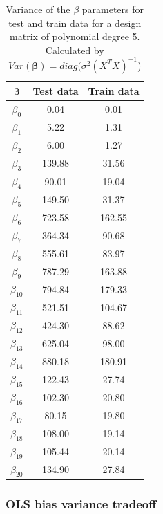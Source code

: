\documentclass[12pt]{article}
\begin{document}
\begin{table}[H]
  \caption{Variance of the $\beta$ parameters for test and train data for a design matrix of polynomial degree 5. Calculated by $Var(\boldsymbol{\beta}) = diag(\sigma^2(X^T X)^{-1}$)}
  \label{tab:beta}
  \centering
  \begin{tabular}{|c|c|c|}
    \hline
    $\boldsymbol{\beta}$ &\textbf{Test data} & \textbf{Train data} \\\hline
    $\beta_{0}$ & 0.04 & 0.01 \\
    $\beta_{1}$ & 5.22 & 1.31 \\
    $\beta_{2}$ & 6.00 & 1.27 \\
    $\beta_{3}$ & 139.88 & 31.56 \\
    $\beta_{4}$ & 90.01 & 19.04 \\
    $\beta_{5}$ & 149.50 & 31.37 \\
    $\beta_{6}$ & 723.58 & 162.55 \\
    $\beta_{7}$ & 364.34 & 90.68 \\
    $\beta_{8}$ & 555.61 & 83.97 \\
    $\beta_{9}$ & 787.29 & 163.88 \\
    $\beta_{10}$ & 794.84 & 179.33 \\
    $\beta_{11}$ & 521.51 & 104.67 \\
    $\beta_{12}$ & 424.30 & 88.62 \\
    $\beta_{13}$ & 625.04 & 98.00 \\
    $\beta_{14}$ & 880.18 & 180.91 \\
    $\beta_{15}$ & 122.43 & 27.74 \\
    $\beta_{16}$ & 102.30 & 20.80 \\
    $\beta_{17}$ & 80.15 & 19.80 \\
    $\beta_{18}$ & 108.00 & 19.14 \\
    $\beta_{19}$ & 105.44 & 20.14 \\
    $\beta_{20}$ & 134.90 & 27.84 \\
    \hline
  \end{tabular}
\end{table}

\subsubsection{OLS bias variance tradeoff}
\end{document}
